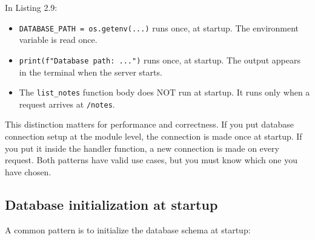 \noindent{}In Listing 2.9:

\begin{itemize}
\tightlist
\item
  \texttt{DATABASE\_}\allowbreak{}\texttt{PATH\ =}\allowbreak{}\texttt{\ os.}\allowbreak{}\texttt{getenv(.}\allowbreak{}\texttt{.}\allowbreak{}\texttt{.}\allowbreak{}\texttt{)} runs once, at startup. The environment variable is read once.
\item
  \texttt{print(f"Database\ path:}\allowbreak{}\texttt{\ .}\allowbreak{}\texttt{.}\allowbreak{}\texttt{.}\allowbreak{}\texttt{")} runs once, at startup. The output appears in the terminal when the server starts.
\item
  The \texttt{list\_notes} function body does NOT run at startup. It runs only when a request arrives at \texttt{/notes}.
\end{itemize}

\noindent{}This distinction matters for performance and correctness. If you put database connection setup at the module level, the connection is made once at startup. If you put it inside the handler function, a new connection is made on every request. Both patterns have valid use cases, but you must know which one you have chosen.

\subsection*{Database initialization at startup}\label{02-runtime-initialization:database-initialization-at-startup}

A common pattern is to initialize the database schema at startup:


